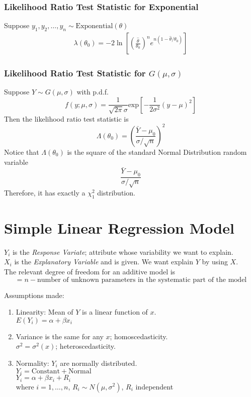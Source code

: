 \documentclass[12pt, leqno]{article}
\theoremstyle{definition}
\begin{document}
  \subsubsection{Likelihood Ratio Test Statistic for Exponential}
  Suppose $y_1, y_2, \dots, y_n \sim \text{Exponential}(\theta)$
  \begin{align*}
    \lambda(\theta_0) = -2
    \ln{
    \left[
      \left(\frac{\hat{\theta}}{\theta_0}\right)^{n}
      e^{n(1 - \hat{\theta}/\theta_0)}
    \right]
    }
  \end{align*}

  \subsubsection{Likelihood Ratio Test Statistic for $G(\mu, \sigma)$}
  Suppose $Y \sim G(\mu, \sigma)$ with p.d.f.
  $$
  f(y; \mu, \sigma) =
  \frac{1}{\sqrt{2\pi}\sigma}
  \text{exp}\left[-\frac{1}{2\sigma^{2}}(y - \mu)^{2}\right]
  $$
  Then the likelihood ratio test statistic is
  $$
  \Lambda(\theta_0) =
  \left(\frac{\bar{Y} - \mu_0}{\sigma/\sqrt{n}}
  \right)^{2}
  $$
  Notice that $\Lambda(\theta_0)$ is the square of the standard Normal Distribution random variable
  $$\frac{\bar{Y} - \mu_0}{\sigma/\sqrt{n}}$$
  Therefore, it has exactly a $\chi_{1}^{2}$ distribution.
  \newpage
  \section{Simple Linear Regression Model}
  $Y_{i}$ is the \emph{Response Variate}; attribute whose variability we want to explain. \\
  $X_{i}$ is the \emph{Explanatory Variable} and is given.
  We want explain $Y$ by using $X$. \\

  The relevant degree of freedom for an additive model is
  $$= n - \text{number of unknown parameters in the systematic part of the model}$$

  Assumptions made:
  \begin{enumerate}
    \item Linearity: Mean of $Y$ is a linear function of $x$.\\
    $E(Y_{i}) = \alpha + \beta x_{i}$
    \item Variance is the same for any $x$; homoscedasticity. \\
    $\sigma^{2} = \sigma^{2}(x)$; heteroscedasticity.
    \item Normality: $Y_{i}$ are normally distributed. \\
    $Y_{i} = \text{Constant} + \text{Normal}$ \\
    $Y_{i} = \alpha + \beta x_{i} + R_{i}$ \\
    where $i = 1, \dots, n$, $R_{i} \sim N(\mu, \sigma^{2})$, $R_{i}$ independent
  \end{enumerate}
\end{document}
